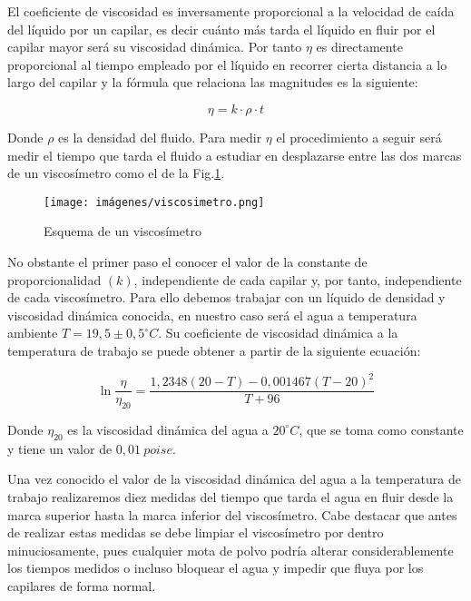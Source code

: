 \documentclass[a4paper,12pt,titlepage]{article}
\begin{document}
\par El coeficiente de viscosidad es inversamente proporcional a la velocidad de caída del líquido por un capilar, es decir cuánto más tarda el líquido en fluir por el capilar mayor será su viscosidad dinámica. Por tanto $\eta$ es directamente proporcional al tiempo empleado por el líquido en recorrer cierta distancia a lo largo del capilar y la fórmula que relaciona las magnitudes es la siguiente:

\begin{equation}
    \eta = k \cdot  \rho \cdot t
    \label{Viscosidad 1}
\end{equation}

Donde $\rho$ es la densidad del fluido. Para medir $\eta$ el procedimiento a seguir será medir el tiempo que tarda el fluido a estudiar en desplazarse entre las dos marcas de un viscosímetro como el de la Fig.\ref{Viscosímetro}.

\begin{figure}[h!]
    \centering
    \texttt{[image: imágenes/viscosimetro.png]}

    \caption{Esquema de un viscosímetro}
    \label{Viscosímetro}
\end{figure}

No obstante el primer paso el conocer el valor de la constante de proporcionalidad $(k)$, independiente de cada capilar y, por tanto, independiente de cada viscosímetro. Para ello debemos trabajar con un líquido de densidad y viscosidad dinámica conocida, en nuestro caso será el agua a temperatura ambiente $T= 19,5\pm 0,5^{\circ} C$. Su coeficiente de viscosidad dinámica a la temperatura de trabajo se puede obtener a partir de la siguiente ecuación:

\begin{equation}
    \ln \frac{\eta}{\eta_{20}} = \frac{1,2348(20-T)-0,001467(T-20)^2}{T+96}
    \label{Coeficientes viscosidad}
\end{equation}

Donde $\eta_{20}$ es la viscosidad dinámica del agua a $20^{\circ}C$, que se toma como constante y tiene un valor de $0,01\: poise$.

\par Una vez conocido el valor de la viscosidad dinámica del agua a la temperatura de trabajo realizaremos diez medidas del tiempo que tarda el agua en fluir desde la marca superior hasta la marca inferior del viscosímetro. Cabe destacar que antes de realizar estas medidas se debe limpiar el viscosímetro por dentro minuciosamente, pues cualquier mota de polvo podría alterar considerablemente los tiempos medidos o incluso bloquear el agua y impedir que fluya por los capilares de forma normal.
\end{document}
